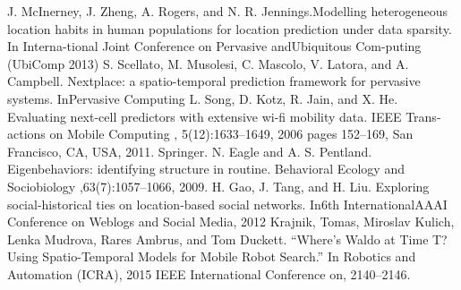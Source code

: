 \documentclass[12pt,parskip=half, DIV=calc, BCOR=10mm, x11names]{scrbook}
\begin{document}
\begin{thebibliography}{99}

 J.  McInerney,  J.  Zheng,  A.  Rogers,  and  N.  R.  Jennings.Modelling heterogeneous location habits in human populations for location prediction under data sparsity. In Interna-tional Joint Conference on Pervasive andUbiquitous Com-puting (UbiComp 2013)
  S.  Scellato,   M.  Musolesi,   C.  Mascolo,   V.  Latora,   and A.  Campbell. Nextplace:   a  spatio-temporal  prediction framework for pervasive systems.  InPervasive Computing
 L. Song, D. Kotz, R. Jain, and X. He.  Evaluating next-cell predictors with extensive wi-fi mobility data. IEEE Trans-actions on Mobile Computing , 5(12):1633–1649, 2006 pages 152–169, San Francisco, CA, USA, 2011. Springer.
N. Eagle and A. S. Pentland.   Eigenbehaviors:  identifying structure in routine. Behavioral Ecology and Sociobiology ,63(7):1057–1066, 2009.
 H.  Gao,  J.  Tang,  and  H.  Liu.   Exploring  social-historical ties on location-based social networks.  In6th InternationalAAAI Conference on Weblogs and Social Media, 2012
 Krajnik, Tomas, Miroslav Kulich, Lenka Mudrova, Rares Ambrus, and Tom Duckett. “Where’s Waldo at Time T? Using Spatio-Temporal Models for Mobile Robot Search.” In Robotics and Automation (ICRA), 2015 IEEE International Conference on, 2140–2146.

\end{thebibliography}
\end{document}
